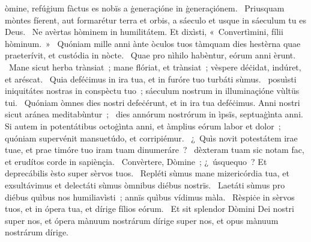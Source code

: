 { }
{%
òmine, refúġium fàctus es nobïs a ġeneraçióne in ġeneraçiónem. 
~Priusquam mòntes fíerent, aut formarétur terra et orbis, a sáeculo et usque in sáeculum tu es Deus. 
~Ne avèrtas hòminem in humilitátem. Et dixìsti, «~Convertìmini, fílii hòminum.~»
~Quóniam mille anni ànte òculos tuos tàmquam dies hestèrna quae praeterívit, et custódia in nòcte. 
~Quae pro nìhilo habèntur, eórum anni èrunt. 
~Mane sicut herba trànsiat~; mane flóriat, et trànsiat~; vèspere déċidat, indúret, et aréscat. 
~Quia deféċimus in ira tua, et in furóre tuo turbáti sùmus. 
~posuìsti iniquitátes nostras in conspèctu tuo~; sáeculum nostrum in illuminaçióne vùltüs tui. 
~Quóniam òmnes dies nostri defeċérunt, et in ira tua deféċimus. Anni nostri sicut aránea meditabùntur~; 
~dies annórum nostrórum in ìpsïs, septuaġìnta anni. Si autem in potentátibus octoġìnta anni, et àmplius eórum labor et dolor~; quóniam supervénit mansuetúdo, et corripiémur. 
~¿~Quìs novit potestátem irae tuae, et prae timóre tuo iram tuam dinumeráre~? 
~dèxteram tuam sic notam fac, et erudítos corde in sapiènçia. 
~Convèrtere, Dòmine~; ¿~úsquequo~? Et deprecábilis èsto super sèrvos tuos. 
~Repléti sùmus mane mizericórdia tua, et exsultávimus et delectáti sùmus òmnibus diébus nostrïs. 
~Laetáti sùmus pro diébus quìbus nos humiliavìsti~; annïs quìbus vídimus màla. 
~Rèspiċe in sèrvos tuos, et in ópera tua, et dírige fílios eórum. 
~Et sit splendor Dòmini Dei nostri super nos, et ópera mànuum nostrárum dírige super nos, et opus mànuum nostrárum dírige. 
}
